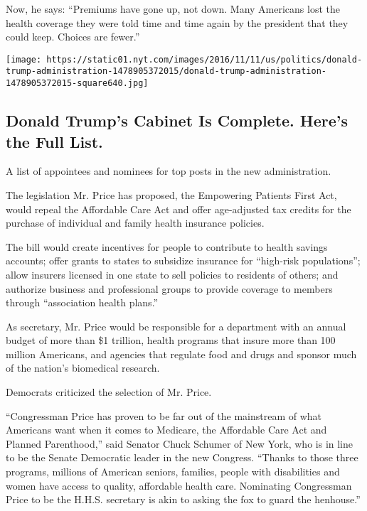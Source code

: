 Now, he says: ``Premiums have gone up, not down. Many Americans lost the
health coverage they were told time and time again by the president that
they could keep. Choices are fewer.''

\href{https://www.nytimes.com/interactive/2016/us/politics/donald-trump-administration.html}{}

\texttt{[image: https://static01.nyt.com/images/2016/11/11/us/politics/donald-trump-administration-1478905372015/donald-trump-administration-1478905372015-square640.jpg]}

\hypertarget{donald-trumps-cabinet-is-complete-heres-the-full-list}{%
\subsection{Donald Trump's Cabinet Is Complete. Here's the Full
List.}\label{donald-trumps-cabinet-is-complete-heres-the-full-list}}

A list of appointees and nominees for top posts in the new
administration.

The legislation Mr. Price has proposed, the Empowering Patients First
Act, would repeal the Affordable Care Act and offer age-adjusted tax
credits for the purchase of individual and family health insurance
policies.

The bill would create incentives for people to contribute to health
savings accounts; offer grants to states to subsidize insurance for
``high-risk populations''; allow insurers licensed in one state to sell
policies to residents of others; and authorize business and professional
groups to provide coverage to members through ``association health
plans.''

As secretary, Mr. Price would be responsible for a department with an
annual budget of more than \$1 trillion, health programs that insure
more than 100 million Americans, and agencies that regulate food and
drugs and sponsor much of the nation's biomedical research.

Democrats criticized the selection of Mr. Price.

``Congressman Price has proven to be far out of the mainstream of what
Americans want when it comes to Medicare, the Affordable Care Act and
Planned Parenthood,'' said Senator Chuck Schumer of New York, who is in
line to be the Senate Democratic leader in the new Congress. ``Thanks to
those three programs, millions of American seniors, families, people
with disabilities and women have access to quality, affordable health
care. Nominating Congressman Price to be the H.H.S. secretary is akin to
asking the fox to guard the henhouse.''

